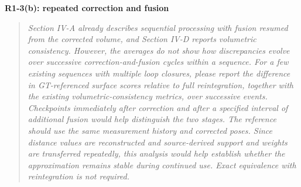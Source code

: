 \documentclass[11pt,a4paper]{article}
\newcommand{\point}[2]{\par\medskip\textbf{#1}\par\begin{quote}\itshape #2\end{quote}}
\begin{document}
\point{R1-3(b): repeated correction and fusion}{Section IV-A already describes sequential processing with fusion resumed from the corrected volume, and Section IV-D reports volumetric consistency. However, the averages do not show how discrepancies evolve over successive correction-and-fusion cycles within a sequence. For a few existing sequences with multiple loop closures, please report the difference in GT-referenced surface scores relative to full reintegration, together with the existing volumetric-consistency metrics, over successive events. Checkpoints immediately after correction and after a specified interval of additional fusion would help distinguish the two stages. The reference should use the same measurement history and corrected poses. Since distance values are reconstructed and source-derived support and weights are transferred repeatedly, this analysis would help establish whether the approximation remains stable during continued use. Exact equivalence with reintegration is not required.}
\end{document}
